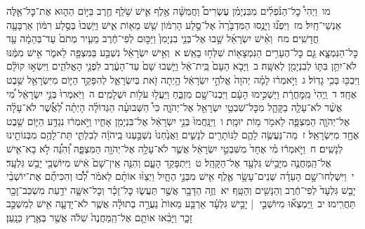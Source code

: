 \documentclass[18pt]{article}
\begin{document}
 {\loc מו~}וַיְהִי֩ כׇל־הַנֹּ֨פְלִ֜ים מִבִּנְיָמִ֗ן עֶשְׂרִים֩ וַחֲמִשָּׁ֨ה אֶ֥לֶף אִ֛ישׁ שֹׁ֥לֵֽף חֶ֖רֶב בַּיּ֣וֹם הַה֑וּא אֶת־כׇּל־אֵ֖לֶּה אַנְשֵׁי־חָֽיִל׃ \startlock
 {\loc מז~}וַיִּפְנ֞וּ וַיָּנֻ֤סוּ הַמִּדְבָּ֙רָה֙ אֶל־סֶ֣לַע הָרִמּ֔וֹן שֵׁ֥שׁ מֵא֖וֹת אִ֑ישׁ וַיֵּֽשְׁבוּ֙ בְּסֶ֣לַע רִמּ֔וֹן אַרְבָּעָ֖ה חֳדָשִֽׁים׃ \startlock
 {\loc מח~}וְאִ֨ישׁ יִשְׂרָאֵ֜ל שָׁ֣בוּ אֶל־בְּנֵ֤י בִנְיָמִן֙ וַיַּכּ֣וּם לְפִי־חֶ֔רֶב מֵעִ֤יר מְתֹם֙ עַד־בְּהֵמָ֔ה עַ֖ד כׇּל־הַנִּמְצָ֑א גַּ֛ם כׇּל־הֶעָרִ֥ים הַנִּמְצָא֖וֹת שִׁלְּח֥וּ בָאֵֽשׁ׃ 
\startlock
 {\loc א~}וְאִ֣ישׁ יִשְׂרָאֵ֔ל נִשְׁבַּ֥ע בַּמִּצְפָּ֖ה לֵאמֹ֑ר אִ֣ישׁ מִמֶּ֔נּוּ לֹא־יִתֵּ֥ן בִּתּ֛וֹ לְבִנְיָמִ֖ן לְאִשָּֽׁה׃ \startlock
 {\loc ב~}וַיָּבֹ֤א הָעָם֙ בֵּֽית־אֵ֔ל וַיֵּ֤שְׁבוּ שָׁם֙ עַד־הָעֶ֔רֶב לִפְנֵ֖י הָאֱלֹהִ֑ים וַיִּשְׂא֣וּ קוֹלָ֔ם וַיִּבְכּ֖וּ בְּכִ֥י גָדֽוֹל׃ \startlock
 {\loc ג~}וַיֹּ֣אמְר֔וּ לָמָ֗ה יְהֹוָה֙ אֱלֹהֵ֣י יִשְׂרָאֵ֔ל הָ֥יְתָה זֹ֖את בְּיִשְׂרָאֵ֑ל לְהִפָּקֵ֥ד הַיּ֛וֹם מִיִּשְׂרָאֵ֖ל שֵׁ֥בֶט אֶחָֽד׃ \startlock
 {\loc ד~}וַֽיְהִי֙  מִֽמׇּחֳרָ֔ת  וַיַּשְׁכִּ֣ימוּ הָעָ֔ם וַיִּבְנוּ־שָׁ֖ם מִזְבֵּ֑חַ וַיַּעֲל֥וּ עֹל֖וֹת וּשְׁלָמִֽים׃ \startlock
 {\loc ה~}וַיֹּֽאמְרוּ֙ בְּנֵ֣י יִשְׂרָאֵ֔ל מִ֠י אֲשֶׁ֨ר לֹא־עָלָ֧ה בַקָּהָ֛ל מִכׇּל־שִׁבְטֵ֥י יִשְׂרָאֵ֖ל אֶל־יְהֹוָ֑ה כִּי֩ הַשְּׁבוּעָ֨ה הַגְּדוֹלָ֜ה הָיְתָ֗ה לַ֠אֲשֶׁ֠ר לֹא־עָלָ֨ה אֶל־יְהֹוָ֧ה הַמִּצְפָּ֛ה לֵאמֹ֖ר מ֥וֹת יוּמָֽת׃ \startlock
 {\loc ו~}וַיִּנָּֽחֲמוּ֙ בְּנֵ֣י יִשְׂרָאֵ֔ל אֶל־בִּנְיָמִ֖ן אָחִ֑יו וַיֹּ֣אמְר֔וּ נִגְדַּ֥ע הַיּ֛וֹם שֵׁ֥בֶט אֶחָ֖ד מִיִּשְׂרָאֵֽל׃ \startlock
 {\loc ז~}מַה־נַּעֲשֶׂ֥ה לָהֶ֛ם לַנּוֹתָרִ֖ים לְנָשִׁ֑ים וַאֲנַ֙חְנוּ֙ נִשְׁבַּ֣עְנוּ בַֽיהֹוָ֔ה לְבִלְתִּ֛י תֵּת־לָהֶ֥ם מִבְּנוֹתֵ֖ינוּ לְנָשִֽׁים׃ \startlock
 {\loc ח~}וַיֹּ֣אמְר֔וּ מִ֗י אֶחָד֙ מִשִּׁבְטֵ֣י יִשְׂרָאֵ֔ל אֲשֶׁ֛ר לֹא־עָלָ֥ה אֶל־יְהֹוָ֖ה הַמִּצְפָּ֑ה וְ֠הִנֵּ֠ה לֹ֣א בָא־אִ֧ישׁ אֶל־הַֽמַּחֲנֶ֛ה מִיָּבֵ֥ישׁ גִּלְעָ֖ד אֶל־הַקָּהָֽל׃ \startlock
 {\loc ט~}וַיִּתְפָּקֵ֖ד הָעָ֑ם וְהִנֵּ֤ה אֵֽין־שָׁם֙ אִ֔ישׁ מִיּוֹשְׁבֵ֖י יָבֵ֥שׁ גִּלְעָֽד׃ \startlock
 {\loc י~}וַיִּשְׁלְחוּ־שָׁ֣ם הָעֵדָ֗ה שְׁנֵים־עָשָׂ֥ר אֶ֛לֶף אִ֖ישׁ מִבְּנֵ֣י הֶחָ֑יִל וַיְצַוּ֨וּ אוֹתָ֜ם לֵאמֹ֗ר לְ֠כ֠וּ וְהִכִּיתֶ֞ם אֶת־יוֹשְׁבֵ֨י יָבֵ֤שׁ גִּלְעָד֙ לְפִי־חֶ֔רֶב וְהַנָּשִׁ֖ים וְהַטָּֽף׃ \startlock
 {\loc יא~}וְזֶ֥ה הַדָּבָ֖ר אֲשֶׁ֣ר תַּעֲשׂ֑וּ כׇּל־זָכָ֗ר וְכׇל־אִשָּׁ֛ה יֹדַ֥עַת מִשְׁכַּב־זָכָ֖ר תַּחֲרִֽימוּ׃ \startlock
 {\loc יב~}וַֽיִּמְצְא֞וּ מִיּוֹשְׁבֵ֣י  |  יָבֵ֣ישׁ גִּלְעָ֗ד אַרְבַּ֤ע מֵאוֹת֙ נַעֲרָ֣ה בְתוּלָ֔ה אֲשֶׁ֧ר לֹא־יָדְעָ֛ה אִ֖ישׁ לְמִשְׁכַּ֣ב זָכָ֑ר וַיָּבִ֨אוּ אוֹתָ֤ם אֶל־הַֽמַּחֲנֶה֙ שִׁלֹ֔ה אֲשֶׁ֖ר בְּאֶ֥רֶץ כְּנָֽעַן׃ \startlock
\end{document}
